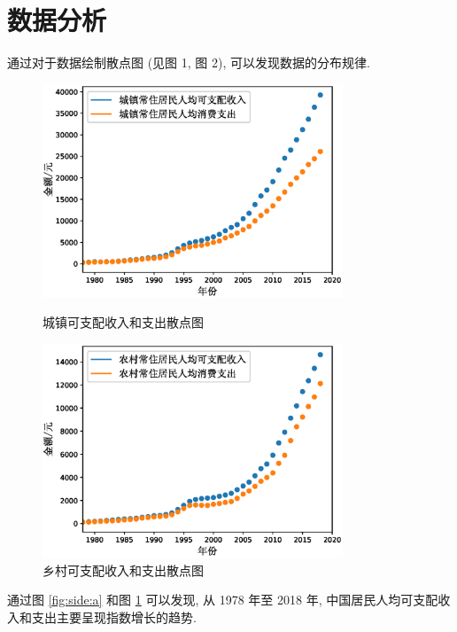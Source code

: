 \documentclass{article}
\begin{document}
\section{数据分析}\label{sec:analysis}
通过对于数据绘制散点图 (见图 1, 图 2), 可以发现数据的分布规律.\\
\begin{figure}[H]
  \centering
  \begin{minipage}[t]{0.48\textwidth}
    \centering
    \includegraphics[width=0.8\textwidth]{figures/plot2.eps}
    \caption{城镇可支配收入和支出散点图}
    \label{fig:side:a}
  \end{minipage}
  \begin{minipage}[t]{0.48\textwidth}
    \centering
    \includegraphics[width=0.8\textwidth]{figures/plot3.eps}
    \caption{乡村可支配收入和支出散点图}
    \label{fig:side:b}
  \end{minipage}
\end{figure}
通过图 \ref{fig:side:a} 和图 \ref{fig:side:b} 可以发现, 从 1978 年至 2018 年, 中国居民人均可支配收入和支出主要呈现指数增长的趋势.\\
\end{document}
